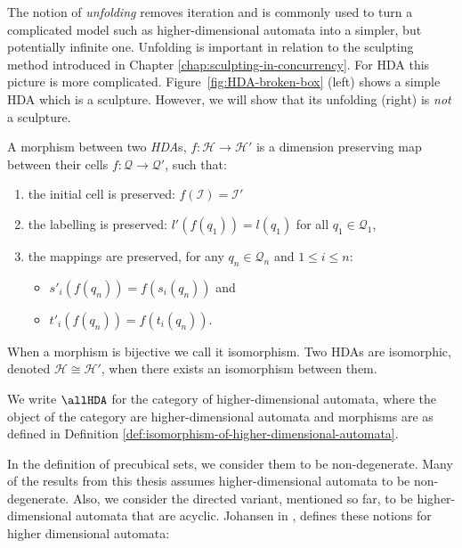     The notion of \emph{unfolding} removes iteration and is commonly used to turn a complicated model such as higher-dimensional automata into a simpler, but potentially infinite one. Unfolding is important in relation to the sculpting method introduced in Chapter \ref{chap:sculpting-in-concurrency}. For HDA this picture is more complicated.  Figure~\ref{fig:HDA-broken-box} (left) shows a simple HDA which is a sculpture. However, we will show that its unfolding (right) is \emph{not} a sculpture.

    \begin{definition}
        \label{def:isomorphism-of-higher-dimensional-automata}
        A morphism between two \emph{HDA}s, $f : \mathcal{H} \rightarrow \mathcal{H}'$ is a dimension preserving map between their cells $f : \mathcal{Q} \rightarrow \mathcal{Q}'$, such that:
        
        \begin{enumerate}
            \item the initial cell is preserved: $f(\mathcal{I}) = \mathcal{I}'$
            \item the labelling is preserved: $l'(f(q_1)) = l(q_1)$ for all $q_1 \in \mathcal{Q}_1$,
            \item the mappings are preserved, for any $q_n \in \mathcal{Q}_n$ and $1 \leq i \leq n$:
            \begin{itemize}
                \item $s'_i(f(q_n)) = f(s_i(q_n))$ and
                \item $t'_i(f(q_n)) = f(t_i(q_n))$.
            \end{itemize}
        \end{enumerate}
        
        When a morphism is bijective we call it isomorphism. Two HDAs are isomorphic, denoted $\mathcal{H} \cong \mathcal{H}'$, when there exists an isomorphism between them.
    \end{definition}

    We write $\allHDA$ for the category of higher-dimensional automata, where the object of the category are higher-dimensional automata and morphisms are as defined in Definition \ref{def:isomorphism-of-higher-dimensional-automata}.
    
    In the definition of precubical sets, we consider them to be non-degenerate. Many of the results from this thesis assumes higher-dimensional automata to be non-degenerate. Also, we consider the directed variant, mentioned so far, to be higher-dimensional automata that are acyclic. Johansen in \cite{Johansen16STstruct}, defines these notions for higher dimensional automata:
    
